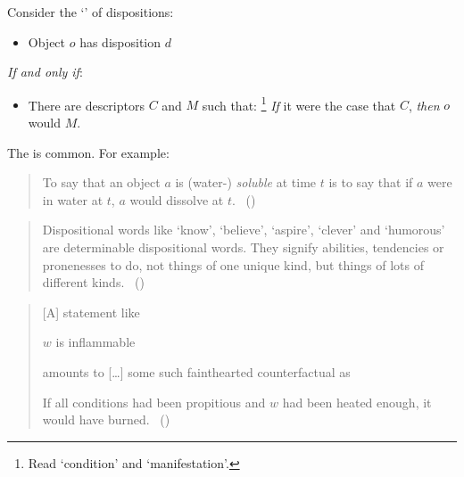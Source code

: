 \begin{note}
  Consider the `' of dispositions:%

  \begin{sketch}
    \label{sketch:dBCA}
    \vspace{-\baselineskip}
    \begin{itemize}
    \item
      Object \(o\) has disposition \(d\)
    \end{itemize}
    \emph{If and only if}:
    \begin{itemize}
    \item
      There are descriptors \(C\) and \(M\) such that:%
      \footnote{
        Read `condition' and `manifestation'.
      }
        \emph{If} it were the case that \(C\), \emph{then} \(o\) would \(M\).
    \end{itemize}
    \vspace{-\baselineskip}
  \end{sketch}

  \noindent%
  The  is common.
  For example:
  \begin{quote}
    To say that an object \(a\) is (water-) \emph{soluble} at time \(t\) is to say that if \(a\) were in water at \(t\), \(a\) would dissolve at \(t\).%
    \mbox{ }\hfill\mbox{(\cite[203]{Quine:2013aa})}
  \end{quote}
  \begin{quote}
    Dispositional words like `know', `believe', `aspire', `clever' and `humorous' are determinable dispositional words.
    They signify abilities, tendencies or pronenesses to do, not things of one unique kind, but things of lots of different kinds.%
    \mbox{ }\hfill\mbox{(\cite[118]{Ryle:1949aa})}
  \end{quote}
  \begin{quote}
    [A] statement like

    \(w\) is inflammable

    amounts to [\dots] some such fainthearted counterfactual as

    If all conditions had been propitious and \(w\) had been heated enough, it would have burned.\newline
    \mbox{ }\hfill\mbox{(\cite[39]{Goodman:1983aa})}
  \end{quote}
\end{note}

